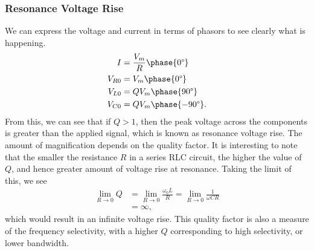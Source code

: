 \documentclass{article}
\begin{document}
\subsubsection{Resonance Voltage Rise}
We can express the voltage and current in terms of phasors to see clearly what is happening.
\begin{align*}
    I &= \frac{V_m}{R}\phase{0\degree}\\
    V_{R 0}&=V_m\phase{0\degree} \\
    V_{L 0}&=QV_m\phase{90\degree}\\
    V_{C 0}&=QV_m\phase{-90\degree}.
\end{align*}
From this, we can see that if $Q>1$, then the peak voltage across the components is greater than the applied signal, which is known as resonance voltage rise. The amount of magnification depends on the quality factor. It is interesting to note that the smaller the resistance $R$ in a series RLC circuit, the higher the value of $Q$, and hence greater amount of voltage rise at resonance. Taking the limit of this, we see
\begin{align*}
    \lim_{R\to 0} Q &= \lim_{R\to 0} \frac{\omega _0L}{R}=\lim_{R\to 0}\frac{1}{\omega CR} \\
                    &= \infty,
\end{align*}
which would result in an infinite voltage rise. This quality factor is also a measure of the frequency selectivity, with a higher $Q$ corresponding to high selectivity, or lower bandwidth.
\end{document}
